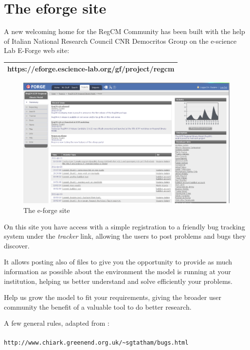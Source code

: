 %
%

\section{The eforge site}

A new welcoming home for the RegCM Community has been built with the help
of Italian National Research Council CNR Democritos Group on the e-science
Lab E-Forge web site:

\vspace{0.5cm}
\begin{tabular}{|c|}
\hline
{\bf https://eforge.escience-lab.org/gf/project/regcm} \\
\hline
\end{tabular}
\vspace{0.5cm}

\begin{figure}[h!]
\caption{The e-forge site}
\centering
\includegraphics[width=12cm]{e-forge}
\end{figure}

On this site you have access with a simple registration to a friendly
bug tracking system under the {\em tracker} link, allowing the users to
post problems and bugs they discover.

It allows posting also of files to give you the opportunity to provide as
much information as possible about the environment the model is running at
your institution, helping us better understand and solve efficiently your
problems.

Help us grow the model to fit your requirements, giving the broader user
community the benefit of a valuable tool to do better research.

A few general rules, adapted from :
\\
 \\
\verb=http://www.chiark.greenend.org.uk/~sgtatham/bugs.html=

